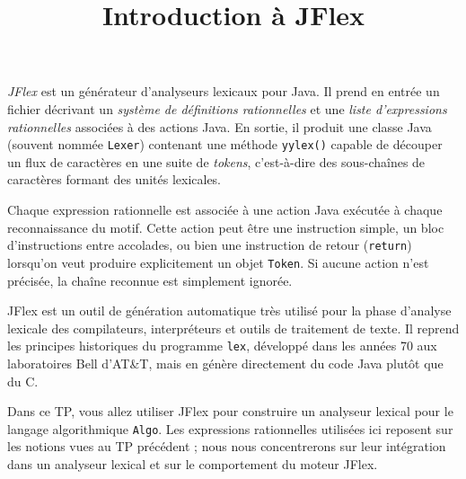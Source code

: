 \documentclass{td}
\title{Introduction à JFlex}
\begin{document}
\maketitle

\emph{JFlex} est un générateur d'analyseurs lexicaux pour Java.
Il prend en entrée un fichier décrivant un \emph{système de définitions rationnelles}
et une \emph{liste d'expressions rationnelles} associées à des actions Java.
En sortie, il produit une classe Java (souvent nommée \texttt{Lexer})
contenant une méthode \texttt{yylex()} capable de découper un flux de caractères
en une suite de \emph{tokens}, c'est-à-dire des sous-chaînes de caractères formant des unités lexicales.

Chaque expression rationnelle est associée à une action Java exécutée à chaque reconnaissance du motif.
Cette action peut être une instruction simple, un bloc d'instructions entre accolades,
ou bien une instruction de retour (\texttt{return}) lorsqu'on veut produire explicitement un objet \texttt{Token}.
Si aucune action n'est précisée, la chaîne reconnue est simplement ignorée.

JFlex est un outil de génération automatique très utilisé pour la phase d'analyse lexicale des compilateurs,
interpréteurs et outils de traitement de texte. Il reprend les principes historiques du programme \texttt{lex},
développé dans les années 70 aux laboratoires Bell d'AT\&T, mais en génère directement du code Java plutôt que du C.

Dans ce TP, vous allez utiliser JFlex pour construire un analyseur lexical
pour le langage algorithmique \texttt{Algo}.
Les expressions rationnelles utilisées ici reposent sur les notions vues
au TP précédent ; nous nous concentrerons sur leur intégration
dans un analyseur lexical et sur le comportement du moteur JFlex.
\end{document}
